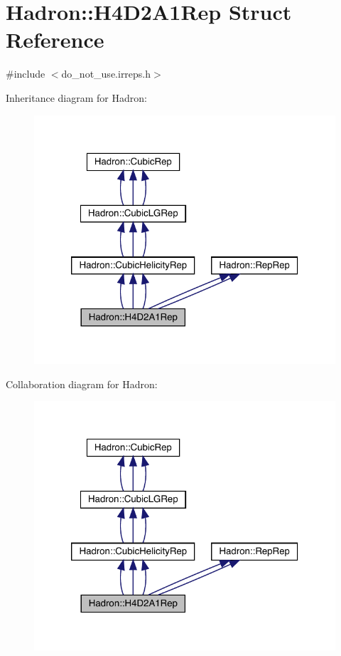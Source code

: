 \hypertarget{structHadron_1_1H4D2A1Rep}{}\section{Hadron\+:\+:H4\+D2\+A1\+Rep Struct Reference}
\label{structHadron_1_1H4D2A1Rep}


{\ttfamily \#include $<$do\+\_\+not\+\_\+use.\+irreps.\+h$>$}



Inheritance diagram for Hadron\+:
\nopagebreak
\begin{figure}[H]
\begin{center}
\leavevmode
\includegraphics[width=320pt]{d8/d77/structHadron_1_1H4D2A1Rep__inherit__graph}
\end{center}
\end{figure}


Collaboration diagram for Hadron\+:
\nopagebreak
\begin{figure}[H]
\begin{center}
\leavevmode
\includegraphics[width=320pt]{d6/d1b/structHadron_1_1H4D2A1Rep__coll__graph}
\end{center}
\end{figure}
